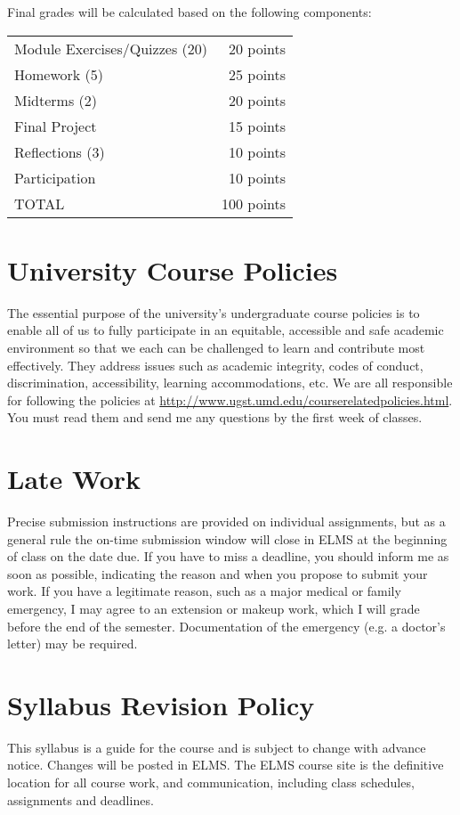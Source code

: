 \documentclass[11pt]{article}
\begin{document}
Final grades will be calculated based on the following components:

\hspace*{.5in}
\begin{tabular}{lr}
	Module Exercises/Quizzes (20) & 20 points \\
	Homework (5) & 25 points \\
	Midterms (2) & 20 points \\
	Final Project & 15 points \\
	Reflections (3) & 10 points \\
	Participation & 10 points \\
	\hline
	TOTAL & 100 points \\
\end{tabular}

\section{University Course Policies}
The essential purpose of the university’s undergraduate course policies is to enable all of us to fully participate in an equitable, accessible and safe academic environment so that we each can be challenged to learn and contribute most effectively. They address issues such as academic integrity, codes of conduct, discrimination, accessibility, learning accommodations, etc. We are all responsible for following the policies at \href{http://www.ugst.umd.edu/courserelatedpolicies.html}{http://www.ugst.umd.edu/courserelatedpolicies.html}. You must read them and send me any questions by the first week of classes.

\section{Late Work}
Precise submission instructions are provided on individual assignments, but as a general rule the on-time submission window will close in ELMS at the beginning of class on the date due.  If you have to miss a deadline, you should inform me as soon as possible, indicating the reason and when you propose to submit your work. If you have a legitimate reason, such as a major medical or family emergency, I may agree to an extension or makeup work, which I will grade before the end of the semester. Documentation of the emergency (e.g. a doctor's letter) may be required.

\section{Syllabus Revision Policy}
This syllabus is a guide for the course and is subject to change with advance notice. Changes will be posted in ELMS. The ELMS course site is the definitive location for all course work, and communication, including class schedules, assignments and deadlines.
\end{document}
